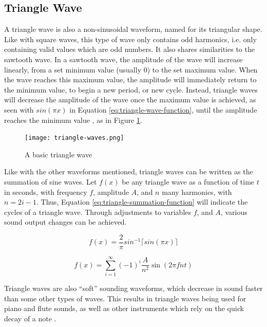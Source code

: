 \subsection{Triangle Wave}

A triangle wave is also a non-sinusoidal waveform, named for its triangular shape. Like with square waves, this type of wave only contains odd harmonics, i.e. only containing valid values which are odd numbers. It also shares similarities to the sawtooth wave. In a sawtooth wave, the amplitude of the wave will increase linearly, from a set minimum value (usually 0) to the set maximum value. When the wave reaches this maximum value, the amplitude will immediately return to the minimum value, to begin a new period, or new cycle. Instead, triangle waves will decrease the amplitude of the wave once the maximum value is achieved, as seen with $sin(\pi x)$ in Equation \ref{eq:triangle-wave-function}, until the amplitude reaches the minimum value \cite{Tarr_2019}, as in Figure \ref{fig:triangle-wave}.

\begin{figure}[ht]
  \centering
  \texttt{[image: triangle-waves.png]}
  \caption{A basic triangle wave}\cite{Wellesley_College_Staff_2021}
  \label{fig:triangle-wave}
\end{figure}


Like with the other waveforms mentioned, triangle waves can be written as the summation of sine waves. Let $f(x)$ be any triangle wave as a function of time $t$ in seconds, with frequency $f$, amplitude $A$, and $n$ many harmonics, with $n = 2i - 1$. Thus, Equation \ref{eq:triangle-summation-function} will indicate the cycles of a triangle wave. Through adjustments to variables $f$, and $A$, various sound output changes can be achieved. 

\begin{equation}
	f(x) = \frac{2}{\pi}sin^{-1}\lceil sin(\pi x) \rceil
	\label{eq:triangle-wave-function}	
\end{equation}

\begin{equation}
	f(x) = \sum_{i=1}^{\infty} (-1)^i \frac{A}{n^2} \sin(2\pi fnt)
	\label{eq:triangle-summation-function}
\end{equation}

Triangle waves are also ``soft'' sounding waveforms, which decrease in sound faster than some other types of waves. This results in triangle waves being used for piano and flute sounds, as well as other instruments which rely on the quick decay of a note \cite{Dowsett_2016}.

